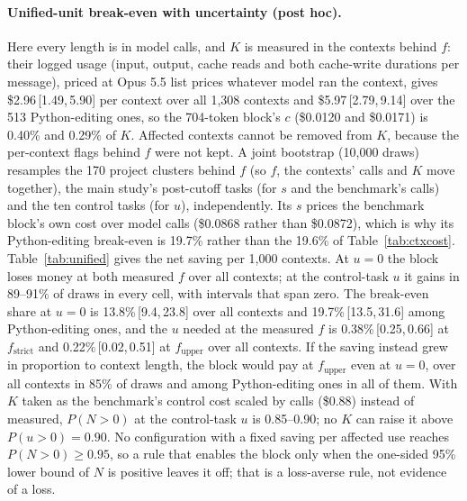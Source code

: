 \documentclass[11pt]{article}
\newcommand{\ci}[2]{\,[#1,\,#2]}
\begin{document}
\paragraph{Unified-unit break-even with uncertainty (post hoc).}
Here every length is in model calls, and $K$ is measured in the contexts behind $f$: their logged usage (input, output, cache reads and both cache-write durations per message), priced at Opus 5.5 list prices whatever model ran the context, gives \$2.96\ci{1.49}{5.90} per context over all 1,308 contexts and \$5.97\ci{2.79}{9.14} over the 513 Python-editing ones, so the 704-token block's $c$ (\$0.0120 and \$0.0171) is 0.40\% and 0.29\% of $K$. Affected contexts cannot be removed from $K$, because the per-context flags behind $f$ were not kept.
A joint bootstrap (10,000 draws) resamples the 170 project clusters behind $f$ (so $f$, the contexts' calls and $K$ move together), the main study's post-cutoff tasks (for $s$ and the benchmark's calls) and the ten control tasks (for $u$), independently. Its $s$ prices the benchmark block's own cost over model calls (\$0.0868 rather than \$0.0872), which is why its Python-editing break-even is 19.7\% rather than the 19.6\% of Table~\ref{tab:ctxcost}.
Table~\ref{tab:unified} gives the net saving per 1,000 contexts. At $u = 0$ the block loses money at both measured $f$ over all contexts; at the control-task $u$ it gains in 89--91\% of draws in every cell, with intervals that span zero. The break-even share at $u = 0$ is 13.8\%\ci{9.4}{23.8} over all contexts and 19.7\%\ci{13.5}{31.6} among Python-editing ones, and the $u$ needed at the measured $f$ is 0.38\%\ci{0.25}{0.66} at $f_\text{strict}$ and 0.22\%\ci{0.02}{0.51} at $f_\text{upper}$ over all contexts.
If the saving instead grew in proportion to context length, the block would pay at $f_\text{upper}$ even at $u = 0$, over all contexts in 85\% of draws and among Python-editing ones in all of them. With $K$ taken as the benchmark's control cost scaled by calls (\$0.88) instead of measured, $P(N>0)$ at the control-task $u$ is 0.85--0.90; no $K$ can raise it above $P(u>0) = 0.90$. No configuration with a fixed saving per affected use reaches $P(N>0) \geq 0.95$, so a rule that enables the block only when the one-sided 95\% lower bound of $N$ is positive leaves it off; that is a loss-averse rule, not evidence of a loss.
\end{document}
